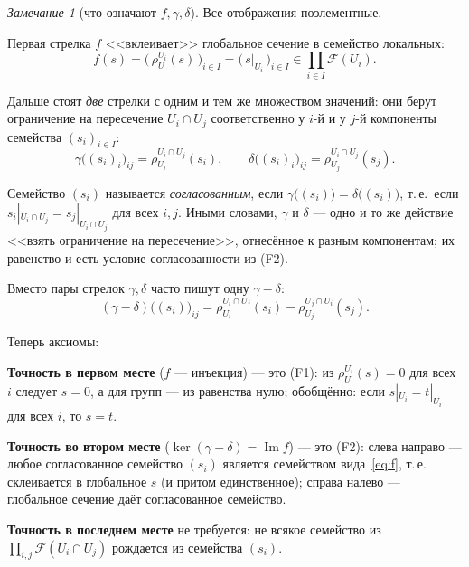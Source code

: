 \documentclass[11pt,b5paper]{article}
\newcommand{\Shv}[1]{\mathscr{#1}}   %
\newcommand{\res}{\rho}              %
\theoremstyle{plain}
\theoremstyle{definition}
\theoremstyle{remark}
\newtheorem{reminner}[thminner]{Замечание}
\newcommand{\thmbeg}{%
  \par\smallskip
  \begin{lrbox}{\thmbox}%
  \begin{minipage}{\linewidth}}
\newcommand{\thmend}{%
  \end{minipage}%
  \end{lrbox}%
  \noindent\usebox{\thmbox}%
  \par\smallskip}
\newenvironment{rem}{\thmbeg\begin{reminner}}{\end{reminner}\thmend}
\begin{document}
\begin{rem}[что означают $f,\gamma,\delta$]\label{rem:gd}
Все отображения поэлементные.
\begin{conditions}
\item Первая стрелка $f$ <<вклеивает>> глобальное сечение в семейство
 локальных:
 \begin{equation}\label{eq:f}
  f(s)=\bigl(\,\res^{U_i}_{U}(s)\,\bigr)_{i\in I}
  =\bigl(\,s|_{U_i}\,\bigr)_{i\in I}
  \in\prod_{i\in I}\Shv{F}(U_i).
 \end{equation}
\item Дальше стоят \emph{две} стрелки с одним и тем же множеством
 значений: они берут ограничение на пересечение $U_i\cap U_j$
 соответственно у $i$-й и у $j$-й компоненты семейства
 $(s_i)_{i\in I}$:
 \begin{equation}\label{eq:gd}
  \gamma\bigl((s_i)_i\bigr)_{ij}=\res^{U_i\cap U_j}_{U_i}(s_i),
  \qquad
  \delta\bigl((s_i)_i\bigr)_{ij}=\res^{U_i\cap U_j}_{U_j}(s_j).
 \end{equation}
\item Семейство $(s_i)$ называется \emph{согласованным}, если
 $\gamma\bigl((s_i)\bigr)=\delta\bigl((s_i)\bigr)$, т.\,е.\ если
 $s_i|_{U_i\cap U_j}=s_j|_{U_i\cap U_j}$ для всех $i,j$. Иными словами,
 $\gamma$ и $\delta$ --- одно и то же действие <<взять ограничение на
 пересечение>>, отнесённое к разным компонентам; их равенство и есть
 условие согласованности из (F2).
\end{conditions}
Вместо пары стрелок $\gamma,\delta$ часто пишут одну $\gamma-\delta$:
\begin{equation}\label{eq:gmd}
 (\gamma-\delta)\bigl((s_i)\bigr)_{ij}
 =\res^{U_i\cap U_j}_{U_i}(s_i)-\res^{U_j\cap U_i}_{U_j}(s_j).
\end{equation}
\end{rem}

Теперь аксиомы:
\begin{bullets}
\item \textbf{Точность в первом месте} ($f$ --- инъекция) --- это (F1):
 из $\res^{U_i}_{U}(s)=0$ для всех $i$ следует $s=0$, а для групп ---
 из равенства нулю; обобщённо: если $s|_{U_i}=t|_{U_i}$ для всех $i$,
 то $s=t$.
\item \textbf{Точность во втором месте} ($\ker(\gamma-\delta)=
 \operatorname{Im}f$) --- это (F2): слева направо --- любое согласованное
 семейство $(s_i)$ является семейством вида~\eqref{eq:f}, т.\,е.
 склеивается в глобальное $s$ (и притом единственное); справа налево ---
 глобальное сечение даёт согласованное семейство.
\item \textbf{Точность в последнем месте} не требуется: не всякое
 семейство из $\prod_{i,j}\Shv{F}(U_i\cap U_j)$ рождается из
 семейства $(s_i)$.
\end{bullets}
\end{document}
